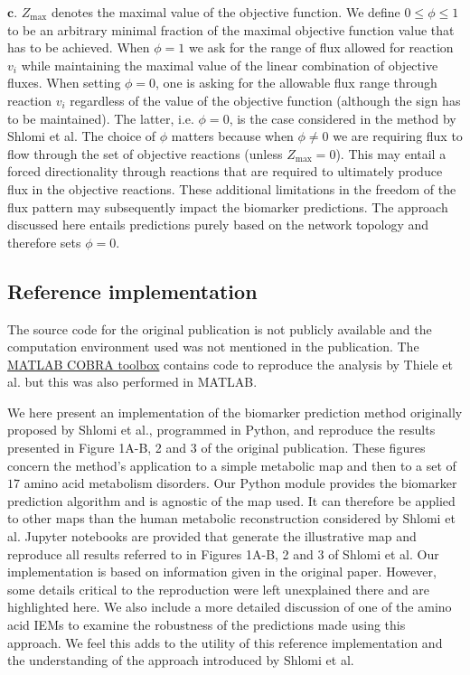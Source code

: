\documentclass[10pt,a4paper,onecolumn]{article}
\begin{document}
\(\bm{c}\). \(Z_{\text{max}}\) denotes the maximal value of the
objective function. We define \(0 \leq \phi \leq 1\) to be an arbitrary
minimal fraction of the maximal objective function value that has to be
achieved. When \(\phi=1\) we ask for the range of flux allowed for
reaction \(v_i\) while maintaining the maximal value of the linear
combination of objective fluxes. When setting \(\phi = 0\), one is
asking for the allowable flux range through reaction \(v_i\) regardless
of the value of the objective function (although the sign has to be
maintained). The latter, i.e. \(\phi=0\), is the case considered in the
method by Shlomi et al. The choice of \(\phi\) matters because when
\(\phi \neq 0\) we are requiring flux to flow through the set of
objective reactions (unless \(Z_{\text{max}} = 0\)). This may entail a
forced directionality through reactions that are required to ultimately
produce flux in the objective reactions. These additional limitations in
the freedom of the flux pattern may subsequently impact the biomarker
predictions. The approach discussed here entails predictions purely
based on the network topology and therefore sets \(\phi = 0\).

\subsection{Reference implementation}\label{reference-implementation}

The source code for the original publication is not publicly available
and the computation environment used was not mentioned in the
publication. The \href{https://github.com/opencobra/cobratoolbox}{MATLAB
COBRA toolbox} contains code to reproduce the analysis by Thiele et al.
but this was also performed in MATLAB.

We here present an implementation of the biomarker prediction method
originally proposed by Shlomi et al., programmed in Python, and
reproduce the results presented in Figure 1A-B, 2 and 3 of the original
publication. These figures concern the method's application to a simple
metabolic map and then to a set of \(17\) amino acid metabolism
disorders. Our Python module provides the biomarker prediction algorithm
and is agnostic of the map used. It can therefore be applied to other
maps than the human metabolic reconstruction considered by Shlomi et al.
Jupyter notebooks are provided that generate the illustrative map and
reproduce all results referred to in Figures 1A-B, 2 and 3 of Shlomi et
al. Our implementation is based on information given in the original
paper. However, some details critical to the reproduction were left
unexplained there and are highlighted here. We also include a more
detailed discussion of one of the amino acid IEMs to examine the
robustness of the predictions made using this approach. We feel this
adds to the utility of this reference implementation and the
understanding of the approach introduced by Shlomi et al.
\end{document}
